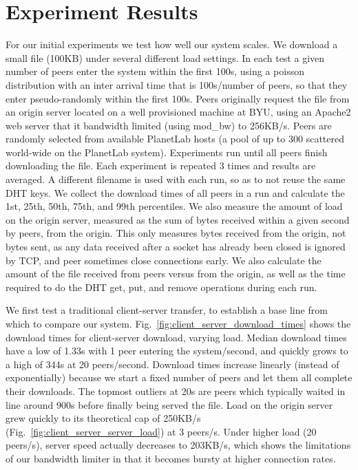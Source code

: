 
\section{Experiment Results}
For our initial experiments we test how well our system scales. We download a small file (100KB) 
under several different load settings. In each test a given number of peers enter the system within 
the first 100s, using a poisson distribution with an inter arrival time that is 100s/number of peers, 
so that they enter pseudo-randomly within the first 100s. Peers originally request the file from 
an origin server located on a well provisioned machine at BYU, using an Apache2 web server that it 
bandwidth limited (using mod\_bw) to 256KB/s. Peers are randomly selected from available PlanetLab 
hosts (a pool of up to 300 scattered world-wide on the PlanetLab system). Experiments run until 
all peers finish downloading the file. Each experiment is repeated 3 times and results are averaged. 
A different filename is used with each run, so as to not reuse the same DHT keys. We collect the download 
times of all peers in a run and calculate the 1st, 25th, 50th, 75th, and 99th percentiles. We also 
measure the amount of load on the origin server, measured as the sum of bytes received within a given 
second by peers, from the origin. This only measures bytes received from the origin, not bytes sent, 
as any data received after a socket has already been closed is ignored by TCP, and peer sometimes 
close connections early. We also calculate the amount of the file received from peers versus from 
the origin, as well as the time required to do the DHT get, put, and remove operations during each 
run.

We first test a traditional client-server transfer, to establish a base line from which to compare 
our system. Fig.~\ref{fig:client_server_download_times} shows the download times for client-server 
download, varying load. Median download times have a low of 1.33s with 1 peer entering the system/second, 
and quickly grows to a high of 344s at 20 peers/second. Download times increase linearly (instead 
of exponentially) because we start a fixed number of peers and let them all complete their downloads. 
The topmost outliers at 20s are peers which typically waited in line around 900s before finally 
being served the file. Load on the origin server grew quickly to its theoretical cap of 250KB/s (Fig.~\ref{fig:client_server_server_load}) 
at 3 peers/s. Under higher load (20 peers/s), server speed actually decreases to 203KB/s, which 
shows the limitations of our bandwidth limiter in that it becomes bursty at higher connection rates. 

